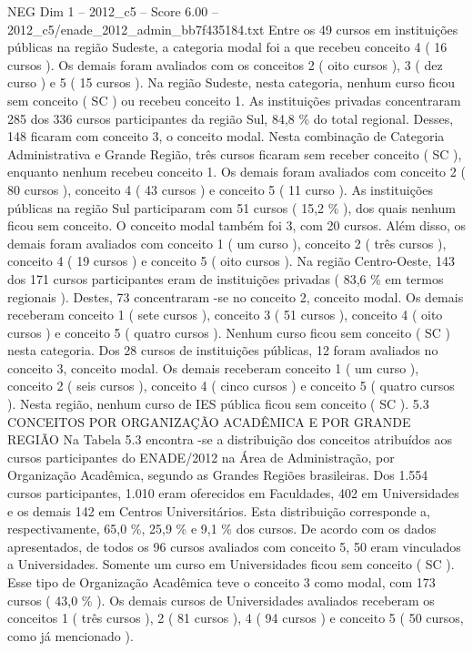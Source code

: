 \begin{textsample}{NEG Dim 1 – 2012\_c5 – Score 6.00 – 2012\_c5/enade\_2012\_admin\_bb7f435184.txt}
Entre os 49 cursos em instituições públicas na região Sudeste, a categoria modal foi a que recebeu conceito 4 ( 16 cursos ).
Os demais foram avaliados com os conceitos 2 ( oito cursos ), 3 ( dez curso ) e 5 ( 15 cursos ).
Na região Sudeste, nesta categoria, nenhum curso ficou sem conceito ( SC ) ou recebeu conceito 1.
As instituições privadas concentraram 285 dos 336 cursos participantes da região Sul, 84,8 \% do total regional.
Desses, 148 ficaram com conceito 3, o conceito modal.
Nesta combinação de Categoria Administrativa e Grande Região, três cursos ficaram sem receber conceito ( SC ), enquanto nenhum recebeu conceito 1.
Os demais foram avaliados com conceito 2 ( 80 cursos ), conceito 4 ( 43 cursos ) e conceito 5 ( 11 curso ).
As instituições públicas na região Sul participaram com 51 cursos ( 15,2 \% ), dos quais nenhum ficou sem conceito.
O conceito modal também foi 3, com 20 cursos.
Além disso, os demais foram avaliados com conceito 1 ( um curso ), conceito 2 ( três cursos ), conceito 4 ( 19 cursos ) e conceito 5 ( oito cursos ).
Na região Centro-Oeste, 143 dos 171 cursos participantes eram de instituições privadas ( 83,6 \% em termos regionais ).
Destes, 73 concentraram -se no conceito 2, conceito modal.
Os demais receberam conceito 1 ( sete cursos ), conceito 3 ( 51 cursos ), conceito 4 ( oito cursos ) e conceito 5 ( quatro cursos ).
Nenhum curso ficou sem conceito ( SC ) nesta categoria.
Dos 28 cursos de instituições públicas, 12 foram avaliados no conceito 3, conceito modal.
Os demais receberam conceito 1 ( um curso ), conceito 2 ( seis cursos ), conceito 4 ( cinco cursos ) e conceito 5 ( quatro cursos ).
Nesta região, nenhum curso de IES pública ficou sem conceito ( SC ). 5.3 CONCEITOS POR ORGANIZAÇÃO ACADÊMICA E POR GRANDE REGIÃO Na Tabela 5.3 encontra -se a distribuição dos conceitos atribuídos aos cursos participantes do ENADE/2012 na Área de Administração, por Organização Acadêmica, segundo as Grandes Regiões brasileiras.
Dos 1.554 cursos participantes, 1.010 eram oferecidos em Faculdades, 402 em Universidades e os demais 142 em Centros Universitários.
Esta distribuição corresponde a, respectivamente, 65,0 \%, 25,9 \% e 9,1 \% dos cursos.
De acordo com os dados apresentados, de todos os 96 cursos avaliados com conceito 5, 50 eram vinculados a Universidades.
Somente um curso em Universidades ficou sem conceito ( SC ).
Esse tipo de Organização Acadêmica teve o conceito 3 como modal, com 173 cursos ( 43,0 \% ).
Os demais cursos de Universidades avaliados receberam os conceitos 1 ( três cursos ), 2 ( 81 cursos ), 4 ( 94 cursos ) e conceito 5 ( 50 cursos, como já mencionado ).

\end{textsample}
